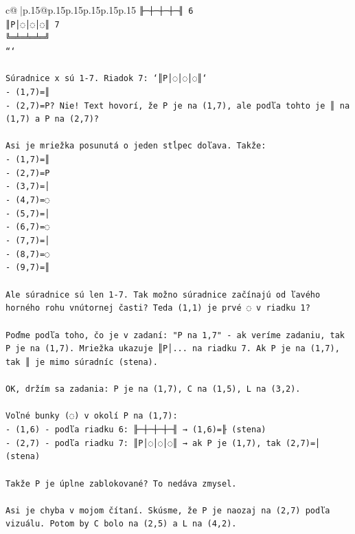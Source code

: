 \documentclass{article}
\begin{document}
{\begin{supertabular}{c@{$\;$}|p{.15\linewidth}@{}p{.15\linewidth}p{.15\linewidth}p{.15\linewidth}p{.15\linewidth}p{.15\linewidth}}
{{{\texttt{╟─┼─┼─┼─╢ 6} \\
\texttt{║P│◌│◌│◌║ 7} \\
\texttt{╚═╧═╧═╧═╝} \\
\texttt{```} \\
\\ 
\texttt{Súradnice x sú 1{-}7. Riadok 7: `║P│◌│◌│◌║`} \\
\texttt{{-} (1,7)=║} \\
\texttt{{-} (2,7)=P? Nie! Text hovorí, že P je na (1,7), ale podľa tohto je ║ na (1,7) a P na (2,7)?} \\
\\ 
\texttt{Asi je mriežka posunutá o jeden stĺpec doľava. Takže:} \\
\texttt{{-} (1,7)=║} \\
\texttt{{-} (2,7)=P} \\
\texttt{{-} (3,7)=│} \\
\texttt{{-} (4,7)=◌} \\
\texttt{{-} (5,7)=│} \\
\texttt{{-} (6,7)=◌} \\
\texttt{{-} (7,7)=│} \\
\texttt{{-} (8,7)=◌} \\
\texttt{{-} (9,7)=║} \\
\\ 
\texttt{Ale súradnice sú len 1{-}7. Tak možno súradnice začínajú od ľavého horného rohu vnútornej časti? Teda (1,1) je prvé ◌ v riadku 1?} \\
\\ 
\texttt{Poďme podľa toho, čo je v zadaní: "P na 1,7" {-} ak veríme zadaniu, tak P je na (1,7). Mriežka ukazuje ║P│... na riadku 7. Ak P je na (1,7), tak ║ je mimo súradníc (stena).} \\
\\ 
\texttt{OK, držím sa zadania: P je na (1,7), C na (1,5), L na (3,2).} \\
\\ 
\texttt{Voľné bunky (◌) v okolí P na (1,7):} \\
\texttt{{-} (1,6) {-} podľa riadku 6: ╟─┼─┼─┼─╢ → (1,6)=╟ (stena)} \\
\texttt{{-} (2,7) {-} podľa riadku 7: ║P│◌│◌│◌║ → ak P je (1,7), tak (2,7)=│ (stena)} \\
\\ 
\texttt{Takže P je úplne zablokované? To nedáva zmysel. } \\
\\ 
\texttt{Asi je chyba v mojom čítaní. Skúsme, že P je naozaj na (2,7) podľa vizuálu. Potom by C bolo na (2,5) a L na (4,2).} \\
}}}
\end{supertabular}}
\end{document}
